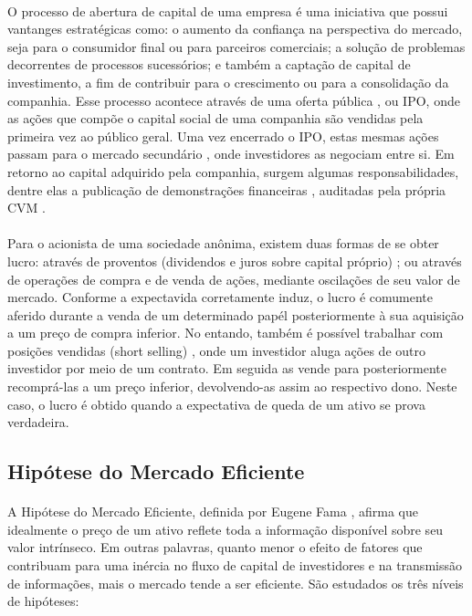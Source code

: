 \paragraph{} O processo de abertura de capital de uma empresa é uma iniciativa que possui vantanges estratégicas \cite{vantagens_sa} como: o aumento da confiança na perspectiva do mercado, seja para o consumidor final ou para parceiros comerciais; a solução de problemas decorrentes de processos sucessórios; e também a captação de capital de investimento, a fim de contribuir para o crescimento ou para a consolidação da companhia. Esse processo acontece através de uma oferta pública \cite{oferta_publica}, ou IPO, onde as ações que compõe o capital social \cite{capital_social} de uma companhia são vendidas pela primeira vez ao público geral. Uma vez encerrado o IPO, estas mesmas ações passam para o mercado secundário \cite{mercado_secundario}, onde investidores as negociam entre si. Em retorno ao capital adquirido pela companhia, surgem algumas responsabilidades, dentre elas a publicação de demonstrações financeiras \cite{dem_finan}, auditadas pela própria CVM \cite{audi_dem_finan}.

\paragraph{} Para o acionista de uma sociedade anônima, existem duas formas de se obter lucro: através de proventos (dividendos e juros sobre capital próprio) \cite{proventos}; ou através de operações de compra e de venda de ações, mediante oscilações de seu valor de mercado. Conforme a expectavida corretamente induz, o lucro é comumente aferido durante a venda de um determinado papél posteriormente à sua aquisição a um preço de compra inferior. No entando, também é possível trabalhar com posições vendidas (short selling) \cite{short_selling}, onde um investidor aluga ações de outro investidor por meio de um contrato. Em seguida as vende para posteriormente recomprá-las a um preço inferior, devolvendo-as assim ao respectivo dono. Neste caso, o lucro é obtido quando a expectativa de queda de um ativo se prova verdadeira.



\FloatBarrier
\subsection{Hipótese do Mercado Eficiente}

\paragraph{} A Hipótese do Mercado Eficiente, definida por Eugene Fama \cite{fama1970efficient}, afirma que idealmente o preço de um ativo reflete toda a informação disponível sobre seu valor intrínseco. Em outras palavras, quanto menor o efeito de fatores que contribuam para uma inércia no fluxo de capital de investidores e na transmissão de informações, mais o mercado tende a ser eficiente. São estudados os três níveis de hipóteses:

